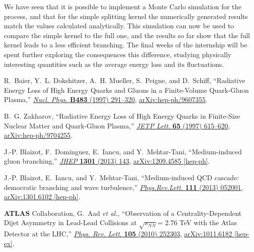 \documentclass[a4paper,12pt]{article}
\numberwithin{equation}{section}
\begin{document}
We have seen that it is possible to implement a Monte Carlo simulation for the process, and that for the simple splitting kernel the numerically generated results match the values calculated analytically. This simulation can now be used to compare the simple kernel to the full one, and the results so far show that the full kernel leads to a less efficient branching. The final weeks of the internship will be spent further exploring the consequences this difference, studying physically interesting quantities such as the average energy loss and its fluctuations.

 \begin{thebibliography}{10}
 
R.~Baier, Y.~L. Dokshitzer, A.~H. Mueller, S.~Peigne, and D.~Schiff,
  ``{Radiative Energy Loss of High Energy Quarks and Gluons in a Finite-Volume
  Quark-Gluon Plasma},''
  \href{http://dx.doi.org/10.1016/S0550-3213(96)00553-6}{{\em Nucl. Phys.}
  {\bfseries B483} (1997) 291--320},
\href{http://arxiv.org/abs/hep-ph/9607355}{{\ttfamily arXiv:hep-ph/9607355}}.

B.~G. Zakharov, ``{Radiative Energy Loss of High Energy Quarks in Finite-Size
  Nuclear Matter and Quark-Gluon Plasma},''
  \href{http://dx.doi.org/10.1134/1.567389}{{\em JETP Lett.} {\bfseries 65}
  (1997) 615--620},
\href{http://arxiv.org/abs/hep-ph/9704255}{{\ttfamily arXiv:hep-ph/9704255}}.

J.-P. Blaizot, F.~Dominguez, E.~Iancu, and Y.~Mehtar-Tani, ``{Medium-induced
  gluon branching},'' \href{http://dx.doi.org/10.1007/JHEP01(2013)143}{{\em
  JHEP} {\bfseries 1301} (2013) 143},
\href{http://arxiv.org/abs/1209.4585}{{\ttfamily arXiv:1209.4585 [hep-ph]}}.


J.-P. Blaizot, E.~Iancu, and Y.~Mehtar-Tani, ``{Medium-induced QCD cascade:
  democratic branching and wave turbulence},''
  \href{http://dx.doi.org/10.1103/PhysRevLett.111.052001}{{\em Phys.Rev.Lett.}
  {\bfseries 111} (2013) 052001},
\href{http://arxiv.org/abs/1301.6102}{{\ttfamily arXiv:1301.6102 [hep-ph]}}.

{\bfseries ATLAS} Collaboration, G.~Aad {\em et al.}, ``{Observation of a
  Centrality-Dependent Dijet Asymmetry in Lead-Lead Collisions at
  $\sqrt{s_{NN}}$= 2.76 TeV with the Atlas Detector at the LHC},''
  \href{http://dx.doi.org/10.1103/PhysRevLett.105.252303}{{\em Phys. Rev.
  Lett.} {\bfseries 105} (2010) 252303},
\href{http://arxiv.org/abs/1011.6182}{{\ttfamily arXiv:1011.6182 [hep-ex]}}.


\end{thebibliography}
\end{document}

